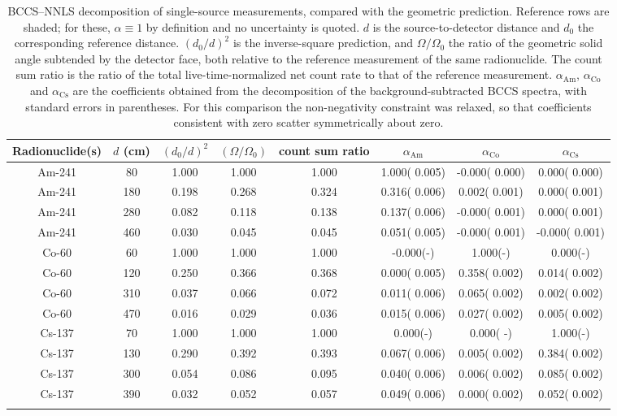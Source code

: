 \documentclass[pdflatex,sn-mathphys-num, table]{sn-jnl}%
\theoremstyle{thmstyleone}%
\theoremstyle{thmstyletwo}%
\theoremstyle{thmstylethree}%
\begin{document}
\begin{table}[h]
\centering
\caption{BCCS--NNLS decomposition of single-source measurements, compared with the geometric prediction. Reference rows are shaded; for these, $\alpha \equiv 1$ by definition and no uncertainty is quoted. $d$ is the source-to-detector distance and $d_0$ the corresponding reference distance. $(d_0/d)^2$ is the inverse-square prediction, and $\Omega/\Omega_0$ the ratio of the geometric solid angle subtended by the detector face, both relative to the reference measurement of the same radionuclide. The count sum ratio is the ratio of the total live-time-normalized net count rate to that of the reference measurement. $\alpha_\text{Am}$, $\alpha_\text{Co}$ and $\alpha_\text{Cs}$ are the coefficients obtained from the decomposition of the background-subtracted BCCS spectra, with standard errors in parentheses. For this comparison the non-negativity constraint was relaxed, so that
coefficients consistent with zero scatter symmetrically about zero.}
\label{tab:single_isotope}
\begin{tabular}{cccccccc}
\toprule
Radionuclide(s) & $d$ (cm) & $(d_0/d)^2$ & $(\Omega/\Omega_0)$ & count sum ratio & $\alpha_\text{Am}$ & $\alpha_\text{Co}$ & $\alpha_\text{Cs}$ \\
\midrule
\rowcolor{gray!20} Am-241  &  80   &      1.000 &     1.000 &        1.000 & 1.000( 0.005) & -0.000( 0.000) &  0.000( 0.000) \\
Am-241  & 180   &      0.198 &     0.268 &        0.324 & 0.316( 0.006) &  0.002( 0.001) &  0.000( 0.001) \\
Am-241  & 280   &      0.082 &     0.118 &        0.138 & 0.137( 0.006) & -0.000( 0.001) &  0.000( 0.001) \\
Am-241  & 460   &      0.030 &     0.045 &        0.045 & 0.051( 0.005) & -0.000( 0.001) & -0.000( 0.001) \\
\rowcolor{gray!20} Co-60   & 60    &      1.000 &     1.000 &        1.000 &-0.000(-) &  1.000(-) &  0.000(-) \\
Co-60   & 120   &      0.250 &     0.366 &        0.368 & 0.000( 0.005) &  0.358( 0.002) &  0.014( 0.002) \\
Co-60   & 310   &      0.037 &     0.066 &        0.072 & 0.011( 0.006) &  0.065( 0.002) &  0.002( 0.002) \\
Co-60   & 470   &      0.016 &     0.029 &        0.036 & 0.015( 0.006) &  0.027( 0.002) &  0.005( 0.002) \\
\rowcolor{gray!20} Cs-137  & 70    &      1.000 &     1.000 &        1.000 & 0.000(-) &  0.000(   -) &  1.000(-) \\
Cs-137  & 130   &      0.290 &     0.392 &        0.393 & 0.067( 0.006) &  0.005( 0.002) &  0.384( 0.002) \\
Cs-137  & 300   &      0.054 &     0.086 &        0.095 & 0.040( 0.006) &  0.006( 0.002) &  0.085( 0.002) \\
Cs-137  & 390   &      0.032 &     0.052 &        0.057 & 0.049( 0.006) &  0.000( 0.002) &  0.052( 0.002) \\

\botrule
\end{tabular}
\end{table}
\end{document}

